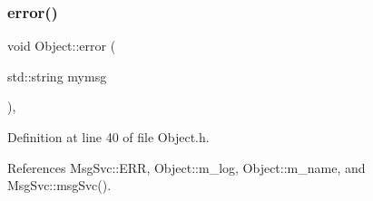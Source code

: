 \mbox{\label{classObject_a204a95f57818c0f811933917a30eff45}} 
\subsubsection{\texorpdfstring{error()}{error()}\hspace{0.1cm}{\footnotesize\ttfamily [1/2]}}
{\footnotesize\ttfamily void Object\+::error (\begin{DoxyParamCaption}\item[{std\+::string}]{mymsg }\end{DoxyParamCaption})\hspace{0.3cm}{\ttfamily [inline]}, {\ttfamily [inherited]}}



Definition at line 40 of file Object.\+h.



References Msg\+Svc\+::\+E\+RR, Object\+::m\+\_\+log, Object\+::m\+\_\+name, and Msg\+Svc\+::msg\+Svc().



